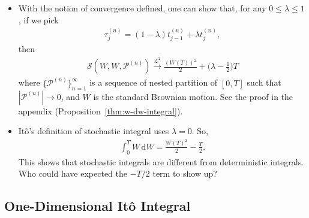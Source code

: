 \documentclass[10pt]{article}
\newcommand{\dee}{\mathrm{d}}
\newcommand{\mcal}[1]{\mathcal{#1}}
\begin{document}
\begin{itemize}
  \item With the notion of convergence defined, one can show that, for any $0 \leq \lambda \leq 1$, if we pick
  \begin{align*}
    \tau_{j}^{(n)} = (1-\lambda) t_{j-1}^{(n)} + \lambda t_{j}^{(n)},
  \end{align*}
  then
  \begin{align*}
    \mcal{S}(W, W, \mcal{P}^{(n)}) \xrightarrow[]{\mcal{L}^2} \frac{(W(T))^2}{2} + \bigg( \lambda - \frac{1}{2} \bigg) T
  \end{align*}
  where $\{ \mcal{P}^{(n)} \}_{n=1}^\infty$ is a sequence of nested partition of $[0,T]$ such that $|\mcal{P}^{(n)}| \rightarrow 0$, and $W$ is the standard Brownian motion. See the proof in the appendix (Proposition~\ref{thm:w-dw-integral}).

  \item It\^{o}'s definition of stochastic integral uses $\lambda = 0$. So, 
  \begin{align*}
    \int_0^T W\, \dee W = \frac{W(T)^2}{2} - \frac{T}{2}.
  \end{align*}
  This shows that stochastic integrals are different from deterministic integrals. Who could have expected the $-T/2$ term to show up?  
\end{itemize}

\subsection{One-Dimensional It\^{o} Integral}
\end{document}
